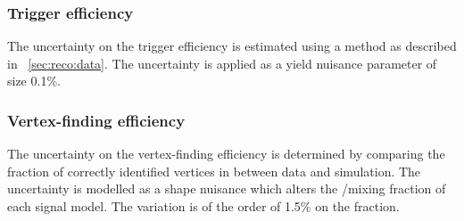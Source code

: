 \subsubsection{Trigger efficiency}
The uncertainty on the trigger efficiency is estimated using a \TagAndProbe method as described in \Sec~\ref{sec:reco:data}. The uncertainty is applied as a yield nuisance parameter of size 0.1\%.

\subsubsection{Vertex-finding efficiency}
The uncertainty on the vertex-finding efficiency is determined by comparing the fraction of correctly identified vertices in \Zmumu between data and simulation. The uncertainty is modelled as a shape nuisance which alters the \RV/\WV mixing fraction of each signal model. The variation is of the order of 1.5\% on the \RV fraction.

